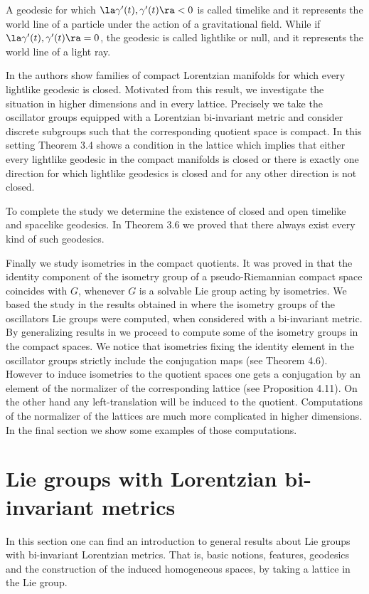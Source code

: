\documentclass[11pt]{amsart}
\theoremstyle{plain}
\theoremstyle{definition}
\theoremstyle{remark}
\begin{document}
A geodesic for which  $\la \gamma'(t), \gamma'(t)\ra < 0$    is called timelike and it represents the world line of a particle
	under the action of a gravitational field. While if $\la \gamma'(t), \gamma'(t)\ra = 0$, the geodesic is called lightlike or
	null, and it represents the world line of a light ray.
	
	
	In \cite{BOV} the authors show families of compact Lorentzian manifolds for which every lightlike geodesic is closed. Motivated from this result, we investigate the situation in higher dimensions and in every lattice. Precisely we take the oscillator groups equipped with a Lorentzian bi-invariant metric and consider discrete subgroups such that the corresponding quotient space is compact.  In this setting Theorem 3.4 shows a condition in the lattice which implies that either every lightlike geodesic in the compact manifolds is closed or there is exactly one direction for which lightlike geodesics is closed and for any other direction is not closed. 
	
	To complete the study we determine the existence of closed and open timelike and spacelike geodesics. In Theorem 3.6 we proved that there always exist every kind of such geodesics. 
	
	Finally we study isometries in the compact quotients. It was proved in \cite{BG} that the identity component of the isometry group of a pseudo-Riemannian compact space coincides with $G$, whenever $G$ is a solvable Lie group acting by isometries.  We based the study in the results obtained in \cite{Bou} where the isometry groups of the oscillators Lie groups were computed, when considered with a bi-invariant metric. By generalizing results in \cite{BOV} we proceed to compute some of the isometry groups in the compact spaces.  We notice that isometries fixing the identity element in the oscillator groups strictly include the conjugation maps (see Theorem 4.6). However to induce isometries to the quotient spaces one gets  a conjugation by an element of the normalizer of the corresponding lattice (see Proposition 4.11). On the other hand any left-translation will be induced to the quotient. Computations of the normalizer of the lattices are much more complicated in higher dimensions. In the final section we show some examples of those computations. 
	
	
	\section{Lie groups with Lorentzian bi-invariant metrics}\label{preeliminares}
	In this section one can find an introduction to general  results about Lie groups with bi-invariant Lorentzian metrics. That is, basic notions, features, geodesics and the construction of the induced  homogeneous spaces, by taking a lattice in the Lie group.  
	
\end{document}
